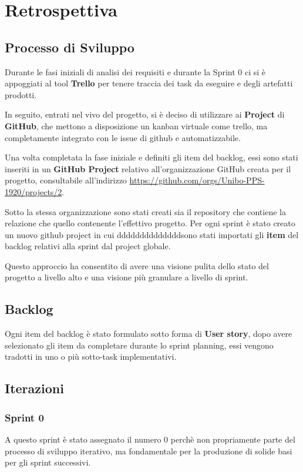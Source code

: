 \chapter{Retrospettiva}

\section{Processo di Sviluppo}
Durante le fasi iniziali di analisi dei requisiti e durante la Sprint 0 ci si è appoggiati al tool \textbf{Trello} per tenere traccia dei task da eseguire e degli artefatti prodotti.

In seguito, entrati nel vivo del progetto, si è deciso di utilizzare ai \textbf{Project} di \textbf{GitHub}, che mettono a disposizione un kanban virtuale come trello, ma completamente integrato con le issue di github e automatizzabile.


Una volta completata la fase iniziale e definiti gli item del backlog, essi sono stati inseriti in un \textbf{GitHub Project} relativo all'organizzazione GitHub creata per il progetto, consultabile all'indirizzo \url{https://github.com/orgs/Unibo-PPS-1920/projects/2}.

Sotto la stessa organizzazione sono stati creati sia il repository che contiene la relazione che quello contenente l'effettivo progetto.
Per ogni sprint è stato creato un nuovo github project in cui ddddddddddddddsono stati importati gli \textbf{item} del backlog relativi alla sprint dal project globale.

Questo approccio ha consentito di avere una visione pulita dello stato del progetto a livello alto e una visione più granulare a livello di sprint.

\section{Backlog}
Ogni item del backlog è stato formulato sotto forma di \textbf{User story}, dopo avere selezionato gli item da completare durante lo sprint planning, essi vengono tradotti in uno o più sotto-task implementativi.

\section{Iterazioni}
\subsection{Sprint 0}
A questo sprint è stato assegnato il numero 0 perchè non propriamente parte del processo di sviluppo iterativo, ma fondamentale per la produzione di solide basi per gli sprint successivi.
